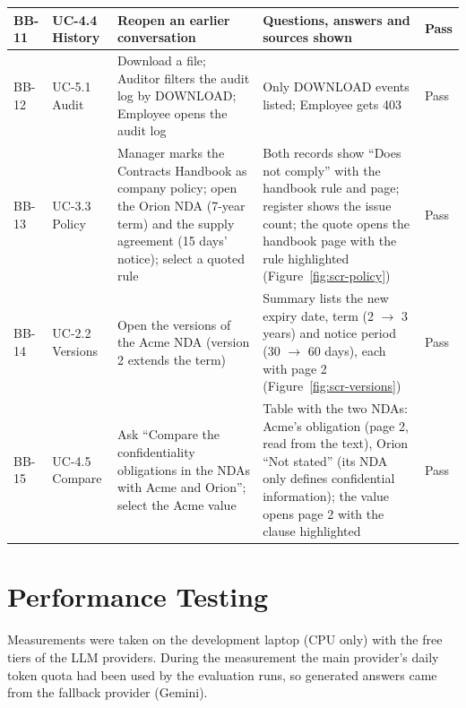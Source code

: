\begin{longtable}{|p{1.15cm}|p{2.0cm}|p{4.6cm}|p{5.0cm}|p{1.3cm}|}
BB-11 & UC-4.4 History & Reopen an earlier conversation & Questions, answers and sources shown & Pass \\ \hline
BB-12 & UC-5.1 Audit & Download a file; Auditor filters the audit log by DOWNLOAD; Employee opens the audit log & Only DOWNLOAD events listed; Employee gets 403 & Pass \\ \hline
BB-13 & UC-3.3 Policy & Manager marks the Contracts Handbook as company policy; open the Orion NDA (7-year term) and the supply agreement (15 days' notice); select a quoted rule & Both records show ``Does not comply'' with the handbook rule and page; register shows the issue count; the quote opens the handbook page with the rule highlighted (Figure~\ref{fig:scr-policy}) & Pass \\ \hline
BB-14 & UC-2.2 Versions & Open the versions of the Acme NDA (version 2 extends the term) & Summary lists the new expiry date, term (2 $\rightarrow$ 3 years) and notice period (30 $\rightarrow$ 60 days), each with page 2 (Figure~\ref{fig:scr-versions}) & Pass \\ \hline
BB-15 & UC-4.5 Compare & Ask ``Compare the confidentiality obligations in the NDAs with Acme and Orion''; select the Acme value & Table with the two NDAs: Acme's obligation (page 2, read from the text), Orion ``Not stated'' (its NDA only defines confidential information); the value opens page 2 with the clause highlighted & Pass \\ \hline
\end{longtable}

\section{Performance Testing}
Measurements were taken on the development laptop (CPU only) with the free tiers of the LLM providers.
During the measurement the main provider's daily token quota had been used by the evaluation runs, so
generated answers came from the fallback provider (Gemini).

